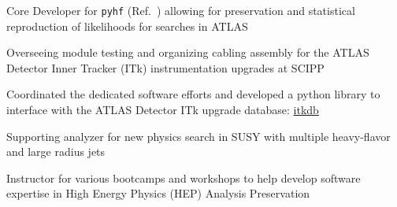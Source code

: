 \documentclass[margin,line]{resume}
\begin{document}
\begin{resume}
\begin{list2}
  \item Core Developer for \texttt{pyhf} (Ref.~\cite{ATL-PHYS-PUB-2019-029}) allowing for preservation and statistical reproduction of likelihoods for searches in ATLAS
  \item Overseeing module testing and organizing cabling assembly for the ATLAS Detector Inner Tracker (ITk) instrumentation upgrades at SCIPP
  \item Coordinated the dedicated software efforts and developed a python library to interface with the ATLAS Detector ITk upgrade database: \href{https://pypi.org/project/itkdb/}{itkdb}
  \item Supporting analyzer for new physics search in SUSY with multiple heavy-flavor and large radius jets \cite{SUSY-2016-10, SUSY-2015-10, ATLAS-CONF-2017-021, ATLAS-CONF-2016-052, ATLAS-CONF-2015-067}
  \item Instructor for various bootcamps and workshops to help develop software expertise in High Energy Physics (HEP) Analysis Preservation~\cite{AwesomeFeb2020,USATLASBootcamp2019}
\end{list2}

\newpage



\end{resume}
\end{document}
